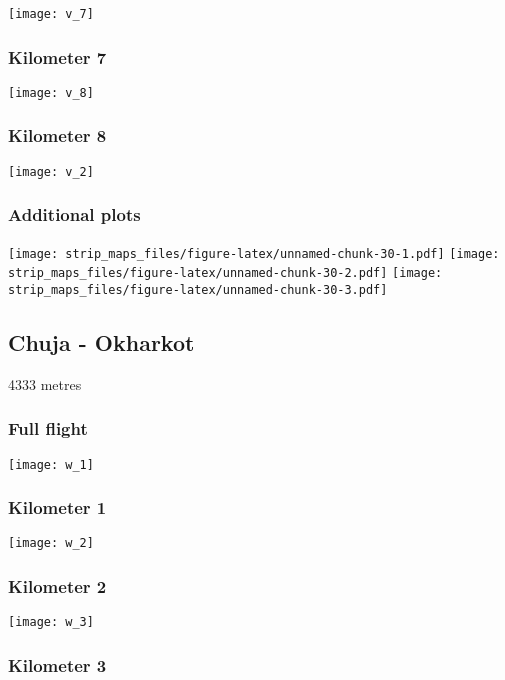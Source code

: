 \documentclass[]{article}
\begin{document}
\texttt{[image: v\_7]}

\subsubsection{Kilometer 7}\label{kilometer-7-10}

\texttt{[image: v\_8]}

\subsubsection{Kilometer 8}\label{kilometer-8-5}

\texttt{[image: v\_2]}

\subsubsection{Additional plots}\label{additional-plots-21}

\texttt{[image: strip\_maps\_files/figure-latex/unnamed-chunk-30-1.pdf]}
\texttt{[image: strip\_maps\_files/figure-latex/unnamed-chunk-30-2.pdf]}
\texttt{[image: strip\_maps\_files/figure-latex/unnamed-chunk-30-3.pdf]}

\newpage

\subsection{Chuja - Okharkot}\label{chuja---okharkot}

4333 metres

\subsubsection{Full flight}\label{full-flight-22}

\texttt{[image: w\_1]}

\subsubsection{Kilometer 1}\label{kilometer-1-22}

\texttt{[image: w\_2]}

\subsubsection{Kilometer 2}\label{kilometer-2-22}

\texttt{[image: w\_3]}

\subsubsection{Kilometer 3}\label{kilometer-3-22}
\end{document}
